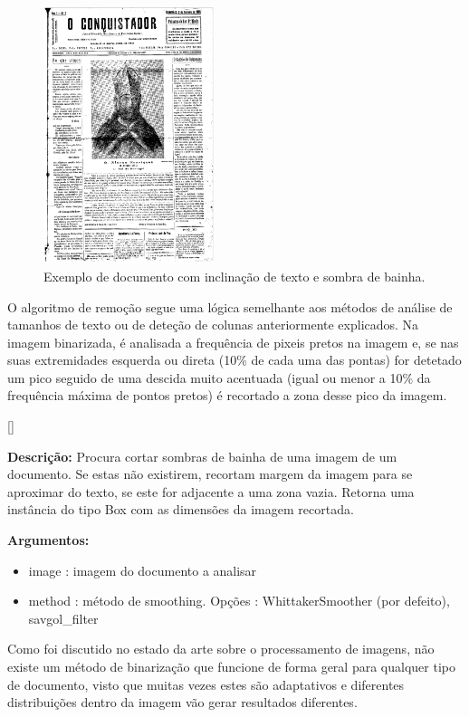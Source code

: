 \begin{figure}[H]
	\centering
	\includegraphics[width=5cm]{images/ilustracoes/document_margin_example.png}
	\caption{Exemplo de documento com inclinação de texto e sombra de bainha.}
	\label{fig:document_margin_example}
\end{figure}



O algoritmo de remoção segue uma lógica semelhante aos métodos de análise de tamanhos de texto ou de deteção de colunas anteriormente explicados. Na imagem binarizada, é analisada a frequência de pixeis pretos na imagem e, se nas suas extremidades esquerda ou direta (10\% de cada uma das pontas) for detetado um pico seguido de uma descida muito acentuada (igual ou menor a 10\% da frequência máxima de pontos pretos) é recortado a zona desse pico da imagem.

[\normalsize]

\textbf{Descrição:} Procura cortar sombras de bainha de uma imagem de um documento. Se estas não existirem, recortam margem da imagem para se aproximar do texto, se este for adjacente a uma zona vazia. Retorna uma instância do tipo Box com as dimensões da imagem recortada.

\textbf{Argumentos:}
\begin{itemize}\setlength\itemsep{-0.3em}
	\item image : imagem do documento a analisar
	\item method : método de smoothing. Opções : WhittakerSmoother (por defeito), savgol\_filter
\end{itemize}


\label{contribution_image_binarization}

Como foi discutido no estado da arte sobre o processamento de imagens, não existe um método de binarização que funcione de forma geral para qualquer tipo de documento, visto que muitas vezes estes são adaptativos e diferentes distribuições dentro da imagem vão gerar resultados diferentes.

